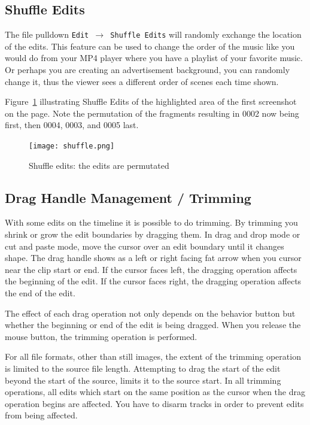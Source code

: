 \subsection{Shuffle Edits}%
\label{sub:shuffle_edits}

The file pulldown \texttt{Edit $\rightarrow$ Shuffle Edits} will
randomly exchange the location of the edits.  This feature can be
used to change the order of the music like you would do from your
MP4 player where you have a playlist of your favorite music.  Or
perhaps you are creating an advertisement background, you can
randomly change it, thus the viewer sees a different order of scenes
each time shown.

Figure~\ref{fig:shuffle} illustrating Shuffle Edits of the
highlighted area of the first screenshot on the page.  Note the
permutation of the fragments resulting in 0002 now being first, then
0004, 0003, and 0005 last.

\begin{figure}[htpb]
  \centering
  \texttt{[image: shuffle.png]}
  \caption{Shuffle edits: the edits are permutated}
  \label{fig:shuffle}
\end{figure}


\subsection{Drag Handle Management / Trimming}%
\label{sub:drag_handle_management_trimming}

With some edits on the timeline it is possible to do trimming. By
trimming you shrink or grow the edit boundaries by dragging them. In
drag and drop mode or cut and paste mode, move the cursor over an
edit boundary until it changes shape. The drag handle shows as a
left or right facing fat arrow when you cursor near the clip start
or end.  If the cursor faces left, the dragging operation affects
the beginning of the edit. If the cursor faces right, the dragging
operation affects the end of the edit.

The effect of each drag operation not only depends on the behavior
button but whether the beginning or end of the edit is being
dragged. When you release the mouse button, the trimming operation
is performed.

For all file formats, other than still images, the extent of the
trimming operation is limited to the source file length. Attempting
to drag the start of the edit beyond the start of the source, limits
it to the source start. In all trimming operations, all edits which
start on the same position as the cursor when the drag operation
begins are affected. You have to disarm tracks in order to prevent
edits from being affected.

